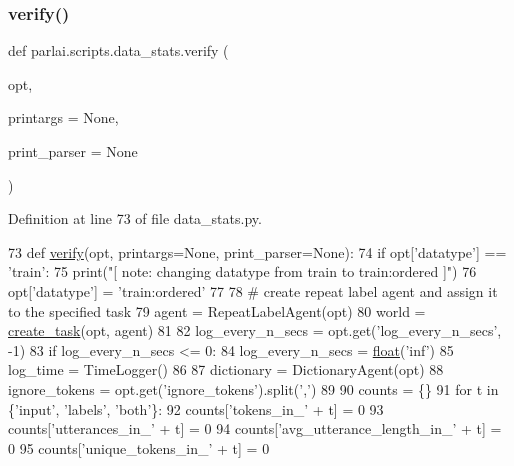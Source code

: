 \subsubsection{\texorpdfstring{verify()}{verify()}}
{\footnotesize\ttfamily def parlai.\+scripts.\+data\+\_\+stats.\+verify (\begin{DoxyParamCaption}\item[{}]{opt,  }\item[{}]{printargs = {\ttfamily None},  }\item[{}]{print\+\_\+parser = {\ttfamily None} }\end{DoxyParamCaption})}



Definition at line 73 of file data\+\_\+stats.\+py.


\begin{DoxyCode}
73 \textcolor{keyword}{def }\hyperlink{namespaceparlai_1_1scripts_1_1data__stats_a3bf0a490abe0b6ea608d1f9ece194c79}{verify}(opt, printargs=None, print\_parser=None):
74     \textcolor{keywordflow}{if} opt[\textcolor{stringliteral}{'datatype'}] == \textcolor{stringliteral}{'train'}:
75         print(\textcolor{stringliteral}{"[ note: changing datatype from train to train:ordered ]"})
76         opt[\textcolor{stringliteral}{'datatype'}] = \textcolor{stringliteral}{'train:ordered'}
77 
78     \textcolor{comment}{# create repeat label agent and assign it to the specified task}
79     agent = RepeatLabelAgent(opt)
80     world = \hyperlink{namespaceparlai_1_1core_1_1worlds_a79969c7ba76d4b3c500f5bb776444dc6}{create\_task}(opt, agent)
81 
82     log\_every\_n\_secs = opt.get(\textcolor{stringliteral}{'log\_every\_n\_secs'}, -1)
83     \textcolor{keywordflow}{if} log\_every\_n\_secs <= 0:
84         log\_every\_n\_secs = \hyperlink{namespaceprojects_1_1controllable__dialogue_1_1make__control__dataset_aa2b7207688c641dbc094ab44eca27113}{float}(\textcolor{stringliteral}{'inf'})
85     log\_time = TimeLogger()
86 
87     dictionary = DictionaryAgent(opt)
88     ignore\_tokens = opt.get(\textcolor{stringliteral}{'ignore\_tokens'}).split(\textcolor{stringliteral}{','})
89 
90     counts = \{\}
91     \textcolor{keywordflow}{for} t \textcolor{keywordflow}{in} \{\textcolor{stringliteral}{'input'}, \textcolor{stringliteral}{'labels'}, \textcolor{stringliteral}{'both'}\}:
92         counts[\textcolor{stringliteral}{'tokens\_in\_'} + t] = 0
93         counts[\textcolor{stringliteral}{'utterances\_in\_'} + t] = 0
94         counts[\textcolor{stringliteral}{'avg\_utterance\_length\_in\_'} + t] = 0
95         counts[\textcolor{stringliteral}{'unique\_tokens\_in\_'} + t] = 0

\end{DoxyCode}
